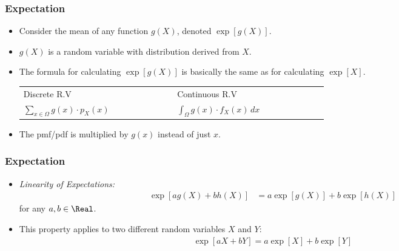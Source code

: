\begin{frame}
\frametitle{Expectation} 
\begin{itemize}
\item Consider the mean of any function $g(X)$, denoted $\exp[g(X)]$.
\item $g(X)$ is a random variable with distribution derived from $X$.
\item The formula for calculating $\exp[g(X)]$ is basically the same as for calculating $\exp[X]$.
\begin{center}
\begin{tabular}{C{0.3\linewidth}C{0.3\linewidth}}
\toprule
Discrete R.V 
    & Continuous R.V\\[2ex]
$\sum_{x\in\Omega} g(x) \cdot p_X(x)$ 
    & $ \int_{\Omega} g(x) \cdot f_X(x)\,dx$\\
\bottomrule
\end{tabular}
\end{center}
\item The pmf/pdf is multiplied by $g(x)$ instead of just $x$.
\end{itemize}
\end{frame}


\begin{frame}
\frametitle{Expectation} 
\begin{itemize}
\item \emph{Linearity of Expectations:}
\begin{align*}
\exp[a g(X) + b h(X)] & = a \exp[g(X)] + b \exp[h(X)]
\end{align*}
for any $a,b\in\Real$. 
\item This property applies to two different random variables $X$ and $Y$:
\begin{align*}
\exp[aX+bY] = a\exp[X] + b\exp[Y]
\end{align*} 
\end{itemize}
\end{frame}


